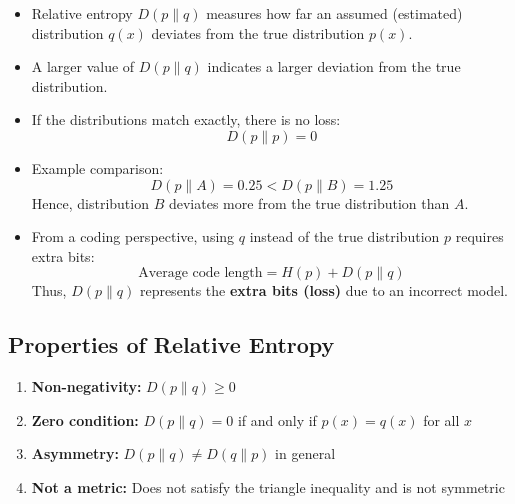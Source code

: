 \documentclass[11pt,a4paper]{book}
\newenvironment{infobox}[1][Information]{
    \begin{tcolorbox}[
        enhanced,
        breakable,
        colback=mintgreen!10,
        colframe=mintgreen!200,
        title=#1,
        fonttitle=\bfseries,
        sharp corners,
        boxrule=0.8pt,
        left=8pt,
        right=8pt,
        top=6pt,
        bottom=6pt
    ]
}{
    \end{tcolorbox}
}
\begin{document}

\begin{infobox}[Interpretation of Relative Entropy]
\begin{itemize}
    \item Relative entropy \(D(p\|q)\) measures how far an assumed (estimated) distribution
          \(q(x)\) deviates from the true distribution \(p(x)\).
    \item A larger value of \(D(p\|q)\) indicates a larger deviation from the true distribution.
    \item If the distributions match exactly, there is no loss:
          \[
              D(p\|p)=0
          \]
    \item Example comparison:
          \[
              D(p\|A)=0.25 < D(p\|B)=1.25
          \]
          Hence, distribution \(B\) deviates more from the true distribution than \(A\).
    \item From a coding perspective, using \(q\) instead of the true distribution \(p\)
          requires extra bits:
          \[
              \text{Average code length} = H(p) + D(p\|q)
          \]
          Thus, \(D(p\|q)\) represents the \textbf{extra bits (loss)} due to an incorrect model.
\end{itemize}
\end{infobox}

\subsection{Properties of Relative Entropy}
\begin{infobox}[Properties of Relative Entropy]
    \begin{enumerate}
    \item \textbf{Non-negativity:} \(D(p \| q) \geq 0\)
    \item \textbf{Zero condition:} \(D(p \| q) = 0\) if and only if \(p(x) = q(x)\) for all \(x\)
    \item \textbf{Asymmetry:} \(D(p \| q) \neq D(q \| p)\) in general
    \item \textbf{Not a metric:} Does not satisfy the triangle inequality and is not symmetric
\end{enumerate}
\end{infobox}
\end{document}
